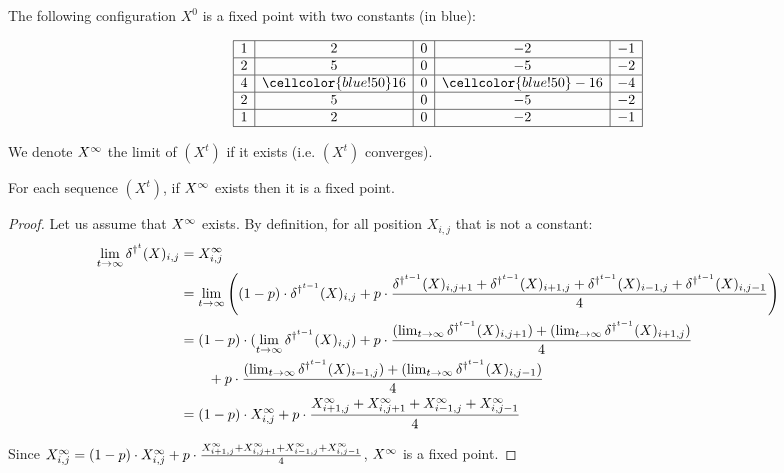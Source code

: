 \begin{ex}
  The following configuration $X^0$ is a fixed point with two constants (in blue):
  
  \[\begin{array}{ | c | c | c | c | c |} \hline
    1 & 2 & 0 & -2 & -1\\ \hline
    2 & 5 & 0 & -5 & -2\\ \hline
    4 & \cellcolor{blue!50} 16 & 0 & \cellcolor{blue!50}  -16 & -4\\ \hline
    2 & 5 & 0 & -5 & -2\\ \hline
    1 & 2 & 0 & -2 & -1\\ \hline
  \end{array}\]
\end{ex}


\begin{defi}
  We denote $X^{\infty}$ the limit of $(X^t)$ if it exists (i.e. $(X^t)$ converges).
\end{defi}

\begin{lemma}
 \label{fix}
 For each sequence $(X^t)$, if $X^{\infty}$ exists then it is a fixed point.
\end{lemma}

\begin{proof}
  Let us assume that $X^{\infty}$ exists. By definition, for all position $X_{i,j}$ that is not a constant:
   \[\begin{split}
      \lim_{t \rightarrow \infty} \delta^{\dag^t}(X)_{i,j} & = X^{\infty}_{i,j} \\
        & = \lim_{t \rightarrow \infty} \left( (1-p) \cdot \delta^{\dag^{t-1}}(X)_{i,j} + p \cdot \frac{\delta^{\dag^{t-1}}(X)_{i,j+1} + \delta^{\dag^{t-1}}(X)_{i+1,j} + \delta^{\dag^{t-1}}(X)_{i-1,j} + \delta^{\dag^{t-1}}(X)_{i,j-1}}{4} \right) \\
        & = (1-p) \cdot (\lim_{t \rightarrow \infty} \delta^{\dag^{t-1}}(X)_{i,j}) + p \cdot \frac{(\lim_{t \rightarrow \infty} \delta^{\dag^{t-1}}(X)_{i,j+1}) + (\lim_{t \rightarrow \infty} \delta^{\dag^{t-1}}(X)_{i+1,j})}{4}\\
        & \qquad + p \cdot \frac{(\lim_{t \rightarrow \infty} \delta^{\dag^{t-1}}(X)_{i-1,j}) + (\lim_{t \rightarrow \infty} \delta^{\dag^{t-1}}(X)_{i,j-1})}{4} \\
        & = (1-p) \cdot X^{\infty}_{i,j} + p \cdot \frac{X^{\infty}_{i+1,j} + X^{\infty}_{i,j+1} + X^{\infty}_{i-1,j} + X^{\infty}_{i,j-1}}{4}
 \end{split}\] 

Since $X^{\infty}_{i,j} = (1-p) \cdot X^{\infty}_{i,j} + p \cdot \frac{X^{\infty}_{i+1,j} + X^{\infty}_{i,j+1} + X^{\infty}_{i-1,j} + X^{\infty}_{i,j-1}}{4}$, $X^{\infty}$ is a fixed point.

\end{proof}

